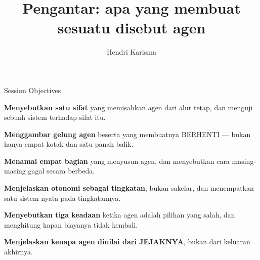 \documentclass[aspectratio=169,11pt,t]{beamer}
\title{Pengantar: apa yang membuat sesuatu disebut agen}
\author{Hendri Karisma}
\date{}
\begin{document}
\covertitle

\begin{frame}[shrink=25]{Session Objectives}
\begin{isteps}
\item \textbf{Menyebutkan satu sifat} yang memisahkan agen dari alur tetap, dan menguji sebuah sistem terhadap sifat itu.
\item \textbf{Menggambar gelung agen} beserta yang membuatnya BERHENTI --- bukan hanya empat kotak dan satu panah balik.
\item \textbf{Menamai empat bagian} yang menyusun agen, dan menyebutkan cara masing-masing gagal secara berbeda.
\item \textbf{Menjelaskan otonomi sebagai tingkatan}, bukan sakelar, dan menempatkan satu sistem nyata pada tingkatannya.
\item \textbf{Menyebutkan tiga keadaan} ketika agen adalah pilihan yang salah, dan menghitung kapan biayanya tidak kembali.
\item \textbf{Menjelaskan kenapa agen dinilai dari JEJAKNYA}, bukan dari keluaran akhirnya.
\end{isteps}

\vskip 6pt
\vskip 4pt
\vskip 2pt
\end{frame}
\end{document}
